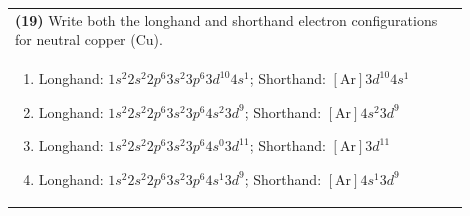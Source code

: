 \documentclass{article}
\begin{document}
\vspace{0.5cm}
\noindent \begin{tabular}{|p{0.9\linewidth}|}
\hline
\vspace{0.2cm}
\textbf{(19)} Write both the longhand and shorthand electron configurations for neutral copper (Cu). \\
\begin{minipage}[t]{0.85\linewidth}
\begin{enumerate}[label=\alph*.]
\item Longhand: $1s^{2}2s^{2}2p^{6}3s^{2}3p^{6}3d^{10}4s^{1}$; Shorthand: $[\text{Ar}]3d^{10}4s^{1}$
\item Longhand: $1s^{2}2s^{2}2p^{6}3s^{2}3p^{6}4s^{2}3d^{9}$; Shorthand: $[\text{Ar}]4s^{2}3d^{9}$
\item Longhand: $1s^{2}2s^{2}2p^{6}3s^{2}3p^{6}4s^{0}3d^{11}$; Shorthand: $[\text{Ar}]3d^{11}$
\item Longhand: $1s^{2}2s^{2}2p^{6}3s^{2}3p^{6}4s^{1}3d^{9}$; Shorthand: $[\text{Ar}]4s^{1}3d^{9}$
\end{enumerate}
\end{minipage}\\
\hline
\end{tabular}
\\
\end{document}
